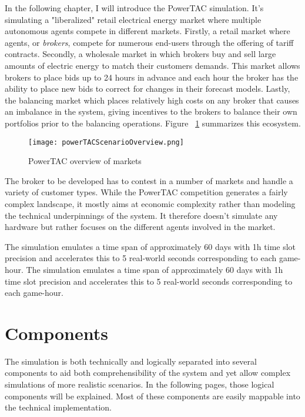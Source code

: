 In the following chapter, I will introduce the \ac{PowerTAC} simulation. It's simulating a "liberalized" retail electrical energy market where multiple autonomous agents compete in different markets. Firstly, a retail market where agents, or \emph{brokers}, compete for numerous end-users through the offering of tariff contracts. Secondly, a wholesale market in which brokers buy and sell large amounts of electric energy to match their customers demands. This market allows brokers to place bids up to 24 hours in advance and each hour the broker has the ability to place new bids to correct for changes in their forecast models. Lastly, the balancing market which places relatively high costs on any broker that causes an imbalance in the system, giving incentives to the brokers to balance their own portfolios prior to the balancing operations. Figure ~\ref{fig:powertacoverview} summarizes this ecosystem.
\begin{figure}[!h]%
    \centering
    \texttt{[image: powerTACScenarioOverview.png]}
	\caption{\ac{PowerTAC} overview of markets}
    \label{fig:powertacoverview}
\end{figure}


The broker to be developed has to contest in a number of markets and handle a variety of customer types. While the \ac{PowerTAC} competition generates a fairly complex landscape, it mostly aims at economic complexity rather than modeling the technical underpinnings of the system. It therefore doesn't simulate any hardware but rather focuses on the different agents involved in the market.

The simulation emulates a time span of approximately 60 days with 1h time slot precision and accelerates this to 5 real-world seconds corresponding to each game-hour. The simulation emulates a time span of approximately 60 days with 1h time slot precision and accelerates this to 5 real-world seconds corresponding to each game-hour.

\section{Components}

The simulation is both technically and logically separated into several components to aid both comprehensibility of the system and yet allow complex simulations of more realistic scenarios. In the following pages, those logical components will be explained. Most of these components are easily mappable into the technical implementation.

